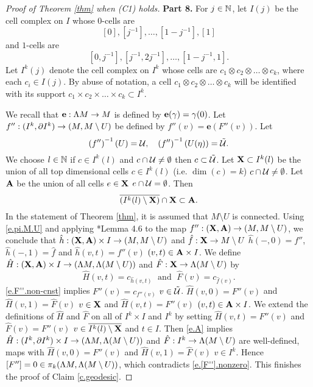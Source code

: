 \documentclass[11pt,twoside]{article}
\begin{document}
\begin{proof}[Proof of Theorem \ref{thm} when (C1) holds]
\noindent\textbf{Part 8.} For \(j\in \mathbb{N}\), let \(I(j)\) be the cell complex on \(I\) whose \(0\)-cells are
\[[0],[j^{-1}],\dots,[1-j^{-1}],[1]\]
and \(1\)-cells are
\[[0,j^{-1}],[j^{-1},2j^{-1}],\dots, [1-j^{-1},1].\]
Let \(I^k(j)\) denote the cell complex on \(I^k\) whose cells are \(c_1\otimes c_2\otimes\dots\otimes c_k\), where each \(c_i\in I(j)\). By abuse of notation, a cell \(c_1\otimes c_2\otimes\dots\otimes c_k\) will be identified with its support \(c_1\times c_2\times\dots\times c_k \subset I^k\).

We recall that \(\mathbf{e}:\Lambda M \rightarrow M\) is defined by \(\mathbf{e}(\gamma)=\gamma(0)\). Let \(f'':(I^k,\partial I^k) \rightarrow (M, M\setminus U)\) be defined by \(f''(v)=\mathbf{e}(F''(v)).\) Let
\[\left(f''\right)^{-1}(U)=\mathcal{U},\quad \left(f''\right)^{-1}(U(\eta))=\tilde{\mathcal{U}}. \]
We choose \(l\in \mathbb{N}\) \sot if \(c\in I^k(l)\) and \(c\cap \mathcal{U}\neq \emptyset\) then \(c \subset \tilde{\mathcal{U}}\). Let \(\mathbf{X} \subset I^k(l)\) be the union of all top dimensional cells \(c\in I^k(l)\) (i.e. \(\dim(c)=k\)) \st \(c\cap \mathcal{U}\neq \emptyset\). Let \(\mathbf{A}\) be the union of all cells \(e\in \mathbf{X}\) \st \(e\cap \mathcal{U} = \emptyset\). Then
\begin{equation}\label{e.A}
\overline{(I^k(l)\setminus \mathbf{X})}\cap \mathbf{X} \subset \mathbf{A}.
\end{equation}
In the statement of Theorem \ref{thm}, it is assumed that $M\setminus U$ is connected. Using \eqref{e.pi.M.U} and applying \cite{Hat}*{Lemma 4.6} to the map \(f'':(\mathbf{X},\mathbf{A})\rightarrow (M,M\setminus U)\), we conclude that \te \(\hat{h}:(\mathbf{X},\mathbf{A})\times I \rightarrow (M,M\setminus U)\) and \(\hat{f}: \mathbf{X} \rightarrow M\setminus U\) \st \(\hat{h}(-,0)=f''\), \(\hat{h}(-,1)=\hat{f}\) and \(\hat{h}(v,t)=f''(v)\) \fa \((v,t)\in \mathbf{A}\times I\). We define \(\hat{H}:(\mathbf{X},\mathbf{A})\times I \rightarrow (\Lambda M,\Lambda (M\setminus U))\) and \(\hat{F}: \mathbf{X} \rightarrow \Lambda (M\setminus U)\) by 
\[\hat{H}(v,t)=c_{\hat{h}(v,t)}\; \text{ and }\; \hat{F}(v)=c_{\hat{f}(v)}.\] 
\eqref{e.F''.non-cnst} implies \(F''(v)=c_{f''(v)}\) \fa \(v\in \tilde{\mathcal{U}}\). \hn \(\hat{H}(v,0)=F''(v)\) and \(\hat{H}(v,1)=\hat{F}(v)\) \fa $v\in \mathbf{X}$ and \(\hat{H}(v,t)=F''(v)\) \fa \((v,t)\in \mathbf{A} \times I\). We extend the definitions of \(\hat{H}\) and \(\hat{F}\) on all of \(I^k\times I\) and \(I^k\) by setting \(\hat{H}(v,t)=F''(v)\) and \(\hat{F}(v)=F''(v)\) \fa \(v\in \overline{I^k(l)\setminus \mathbf{X}}\) and \(t\in I\). Then \eqref{e.A} implies \(\hat{H}:(I^k,\partial I^k)\times I \rightarrow (\Lambda M, \Lambda (M\setminus U))\) and \(\hat{F}:I^k \rightarrow \Lambda (M\setminus U)\) are well-defined, \cts maps with \(\hat{H}(v,0)=F''(v)\) and \(\hat{H}(v,1)=\hat{F}(v)\) \fa \(v\in I^k\). Hence \([F'']=0\in \pi_k(\Lambda M,\Lambda (M\setminus U))\), which contradicts \eqref{e.[F''].nonzero}. This finishes the proof of Claim \ref{c.geodesic}.
\end{proof}
\end{document}
